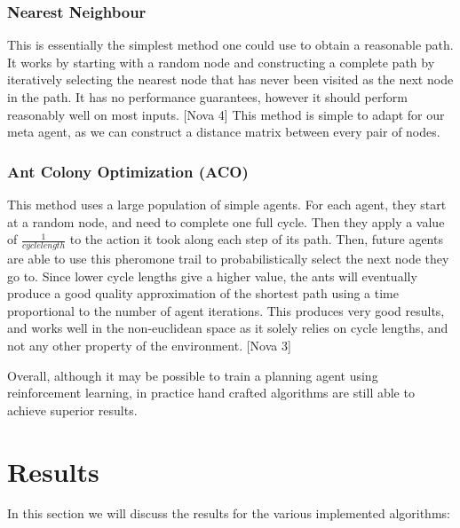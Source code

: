 \documentclass{article}
\begin{document}
	\subsubsection{Nearest Neighbour}
	\label{nearest_neighbour}
	This is essentially the simplest method one could use to obtain a reasonable path. It works by starting with a random node and constructing a complete path by iteratively selecting the nearest node that has never been visited as the next node in the path. It has no performance guarantees, however it should perform reasonably well on most inputs. [Nova 4] This method is simple to adapt for our meta agent, as we can construct a distance matrix between every pair of nodes.
	
	\subsubsection{Ant Colony Optimization (ACO)}
	\label{aco}
	This method uses a large population of simple agents. For each agent, they start at a random node, and need to complete one full cycle. Then they apply a value of $\frac{1}{cycle length}$ to the action it took along each step of its path. Then, future agents are able to use this pheromone trail to probabilistically select the next node they go to. Since lower cycle lengths give a higher value, the ants will eventually produce a good quality approximation of the shortest path using a time proportional to the number of agent iterations. This produces very good results, and works well in the non-euclidean space as it solely relies on cycle lengths, and not any other property of the environment. [Nova 3]
	
	Overall, although it may be possible to train a planning agent using reinforcement learning, in practice hand crafted algorithms are still able to achieve superior results.
	
	\section{Results}
	\label{results}
	In this section we will discuss the results for the various implemented algorithms:
	
\end{document}
